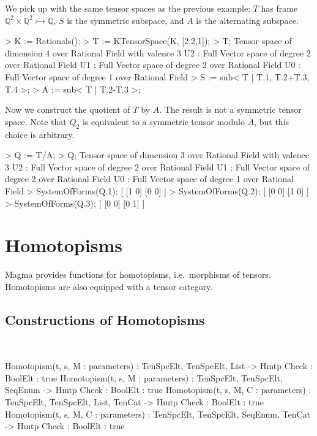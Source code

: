 \begin{example}[QuotientTensorSpaces]

We pick up with the same tensor spaces as the previous example: $T$ has frame $\mathbb{Q}^2\times\mathbb{Q}^2\rightarrowtail \mathbb{Q}$, $S$ is the symmetric subspace, and $A$ is the alternating subspace.
\begin{code}
> K := Rationals();
> T := KTensorSpace(K, [2,2,1]);
> T;
Tensor space of dimension 4 over Rational Field with valence 3
U2 : Full Vector space of degree 2 over Rational Field
U1 : Full Vector space of degree 2 over Rational Field
U0 : Full Vector space of degree 1 over Rational Field
> S := sub< T | T.1, T.2+T.3, T.4 >;
> A := sub< T | T.2-T.3 >;
\end{code}

Now we construct the quotient of $T$ by $A$. 
The result is not a symmetric tensor space. 
Note that $Q_2$ is equivalent to a symmetric tensor modulo $A$, but this choice is arbitrary.
\begin{code}
> Q := T/A;
> Q;
Tensor space of dimension 3 over Rational Field with valence 3
U2 : Full Vector space of degree 2 over Rational Field
U1 : Full Vector space of degree 2 over Rational Field
U0 : Full Vector space of degree 1 over Rational Field
> SystemOfForms(Q.1);
[
    [1 0]
    [0 0]
]
> SystemOfForms(Q.2);
[
    [0 0]
    [1 0]
]
> SystemOfForms(Q.3);
[
    [0 0]
    [0 1]
]
\end{code}
\end{example}

\section{Homotopisms}

Magma provides functions for homotopisms, i.e.\ morphisms of tensors. Homotopisms are also equipped with a tensor category.

\subsection{Constructions of Homotopisms}~

\begin{intrinsics}
Homotopism(t, s, M : parameters) : TenSpcElt, TenSpcElt, List -> Hmtp
    Check : BoolElt : true
Homotopism(t, s, M : parameters) : TenSpcElt, TenSpcElt, SeqEnum -> Hmtp
    Check : BoolElt : true
Homotopism(t, s, M, C : parameters) : TenSpcElt, TenSpcElt, List, TenCat -> Hmtp
    Check : BoolElt : true
Homotopism(t, s, M, C : parameters) : TenSpcElt, TenSpcElt, SeqEnum, TenCat -> Hmtp
    Check : BoolElt : true
\end{intrinsics}

